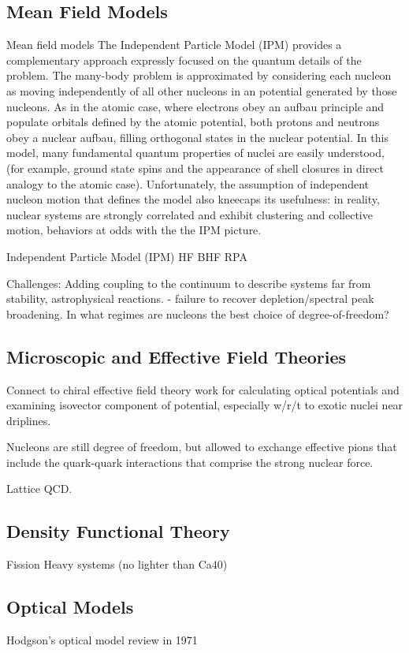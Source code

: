 \begin{eqation}
\subsection{Mean Field Models}
Mean field models The Independent Particle Model (IPM) provides a complementary approach expressly
focused on the quantum details of the problem. The many-body problem is
approximated by considering each nucleon as moving independently of all other
nucleons in an potential generated by those nucleons. As in the atomic case,
where electrons obey an aufbau principle and populate orbitals defined by the
atomic potential, both protons and neutrons obey a nuclear aufbau, filling
orthogonal states in the nuclear potential. In this model, many fundamental
quantum properties of nuclei are easily understood, (for example, ground state spins and
the appearance of shell closures in direct analogy to the atomic case).
Unfortunately, the assumption of independent nucleon motion that defines the model
also kneecaps its usefulness: in reality, nuclear systems are strongly
correlated and exhibit clustering and collective motion, behaviors at odds with the
the IPM picture.

Independent Particle Model (IPM)
HF
BHF
RPA

Challenges: Adding coupling to the continuum to describe systems far from stability,
astrophysical reactions.
- failure to recover depletion/spectral peak broadening. In what regimes are nucleons the best
choice of degree-of-freedom?

\subsection{Microscopic and Effective Field Theories}

Connect to chiral effective field theory work for calculating optical potentials
and examining isovector component of potential, especially w/r/t to exotic
nuclei near driplines.

Nucleons are still degree of freedom, but allowed to exchange effective pions
that include the quark-quark interactions that comprise the strong nuclear
force.

Lattice QCD.

\subsection{Density Functional Theory}
Fission
Heavy systems (no lighter than Ca40)

\subsection{Optical Models}
Hodgson's optical model review in 1971


\end{eqation}
